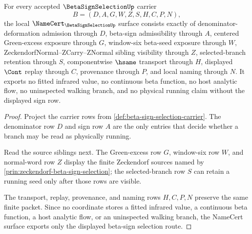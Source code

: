 \begin{theorem}
\label{thm:beta-sign-selection-namecert-obligation-surface}
For every accepted $\BetaSignSelectionUp$ carrier
$$
B=(D,A,G,W,Z,S,H,C,P,N),
$$
the local $\NameCert_{\BetaSignSelectionUp}$ surface consists exactly of denominator-deformation admission through $D$, beta-sign admissibility through $A$, centered Green-excess exposure through $G$, window-six beta-seed exposure through $W$, ZeckendorfNormal--ZCarry--ZNormal sibling visibility through $Z$, selected-branch retention through $S$, componentwise $\hsame$ transport through $H$, displayed $\Cont$ replay through $C$, provenance through $P$, and local naming through $N$. It exports no fitted infrared value, no continuous beta function, no host analytic flow, no uninspected walking branch, and no physical running claim without the displayed sign row.
\end{theorem}
\begin{proof}
Project the carrier rows from \autoref{def:beta-sign-selection-carrier}. The denominator row $D$ and sign row $A$ are the only entries that decide whether a branch may be read as physically running.

Read the source siblings next. The Green-excess row $G$, window-six row $W$, and normal-word row $Z$ display the finite Zeckendorf sources named by \autoref{prin:zeckendorf-beta-sign-selection}; the selected-branch row $S$ can retain a running seed only after those rows are visible.

The transport, replay, provenance, and naming rows $H,C,P,N$ preserve the same finite packet. Since no coordinate stores a fitted infrared value, a continuous beta function, a host analytic flow, or an uninspected walking branch, the NameCert surface exports only the displayed beta-sign selection route.
\end{proof}

\begin{closurestatus}{\BetaSignSelectionUp}
  \theoryclosure{\seedClosure}
  \formalstatus{\unformalizedV}
\end{closurestatus}
